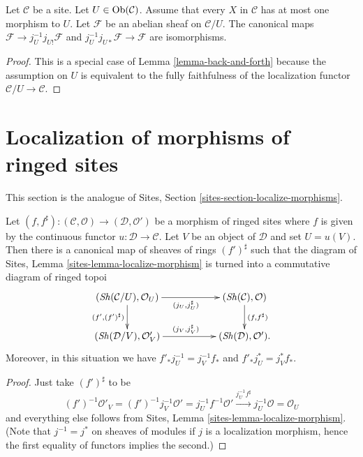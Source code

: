 \begin{lemma}
\label{lemma-restrict-back}
Let $\mathcal{C}$ be a site. Let $U \in \mathop{\mathrm{Ob}}\nolimits(\mathcal{C})$.
Assume that every $X$ in $\mathcal{C}$ has at most
one morphism to $U$. Let $\mathcal{F}$ be an abelian sheaf on $\mathcal{C}/U$.
The canonical maps $\mathcal{F} \to j_U^{-1}j_{U!}\mathcal{F}$
and $j_U^{-1}j_{U*}\mathcal{F} \to \mathcal{F}$ are
isomorphisms.
\end{lemma}

\begin{proof}
This is a special case of Lemma \ref{lemma-back-and-forth}
because the assumption on $U$ is equivalent to the fully faithfulness
of the localization functor $\mathcal{C}/U \to \mathcal{C}$.
\end{proof}









\section{Localization of morphisms of ringed sites}
\label{section-localize-morphisms}

\noindent
This section is the analogue of
Sites, Section \ref{sites-section-localize-morphisms}.

\begin{lemma}
\label{lemma-localize-morphism-ringed-sites}
Let
$(f, f^\sharp) :
(\mathcal{C}, \mathcal{O})
\longrightarrow
(\mathcal{D}, \mathcal{O}')$
be a morphism of ringed sites where $f$ is given by the continuous
functor $u : \mathcal{D} \to \mathcal{C}$.
Let $V$ be an object of $\mathcal{D}$ and set $U = u(V)$.
Then there is a canonical map of sheaves of rings $(f')^\sharp$
such that the diagram of
Sites, Lemma \ref{sites-lemma-localize-morphism}
is turned into a commutative diagram of ringed topoi
$$
\xymatrix{
(\Sh(\mathcal{C}/U), \mathcal{O}_U)
\ar[rr]_{(j_U, j_U^\sharp)} \ar[d]_{(f', (f')^\sharp)} & &
(\Sh(\mathcal{C}), \mathcal{O})
\ar[d]^{(f, f^\sharp)} \\
(\Sh(\mathcal{D}/V), \mathcal{O}'_V)
\ar[rr]^{(j_V, j_V^\sharp)} & &
(\Sh(\mathcal{D}), \mathcal{O}').
}
$$
Moreover, in this situation we have $f'_*j_U^{-1} = j_V^{-1}f_*$
and $f'_*j_U^* = j_V^*f_*$.
\end{lemma}

\begin{proof}
Just take $(f')^\sharp$ to be
$$
(f')^{-1}\mathcal{O}'_V =
(f')^{-1}j_V^{-1}\mathcal{O}' =
j_U^{-1}f^{-1}\mathcal{O}' \xrightarrow{j_U^{-1}f^\sharp}
j_U^{-1}\mathcal{O} = \mathcal{O}_U
$$
and everything else follows from
Sites, Lemma \ref{sites-lemma-localize-morphism}.
(Note that $j^{-1} = j^*$ on sheaves of modules if $j$ is a localization
morphism, hence the first equality of functors implies the second.)
\end{proof}

